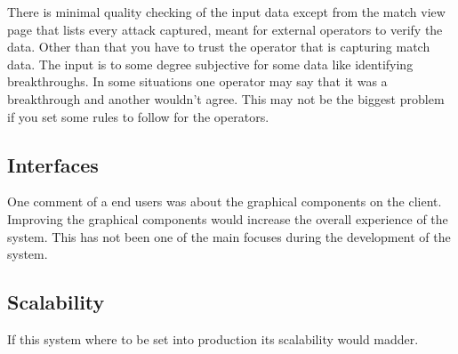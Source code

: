 There is minimal quality checking of the input data except from the match view page that lists every attack captured, meant for external operators to verify the data. Other than that you have to trust the operator that is capturing match data. The input is to some degree subjective for some data like identifying breakthroughs. In some situations one operator may say that it was a breakthrough and another wouldn't agree. This may not be the biggest problem if you set some rules to follow for the operators.

\subsection{Interfaces}

One comment of a end users was about the graphical components on the client. Improving the graphical components would increase the overall experience of the system. This has not been one of the main focuses during the development of the system.

\subsection{Scalability}

If this system where to be set into production its scalability would madder.